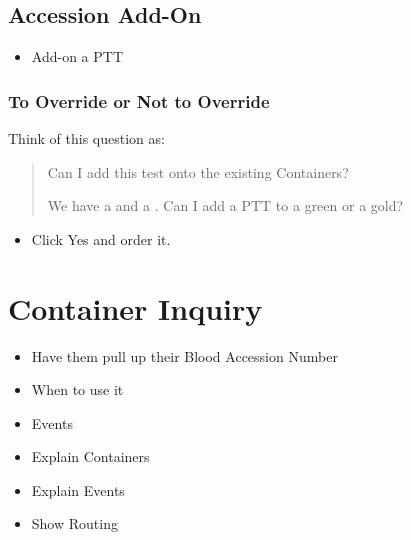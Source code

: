     \section{Accession Add-On}
        \begin{itemize}
            \item Add-on a PTT
        \end{itemize}


    \subsection{To Override or Not to Override}
        Think of this question as:
        \begin{quote}
            Can I add this test onto the existing Containers?

            We have a  and a . Can I add a PTT to a green or a gold?
        \end{quote}
        \begin{itemize}
            \item Click Yes and order it.
        \end{itemize}


\chapter{Container Inquiry}

\begin{itemize}
    \item Have them pull up their Blood Accession Number

\end{itemize}


\begin{itemize}
    \item When to use it
    \item Events
\end{itemize}


\begin{itemize}
    \item Explain Containers
    \item Explain Events
    \item Show Routing
\end{itemize}

